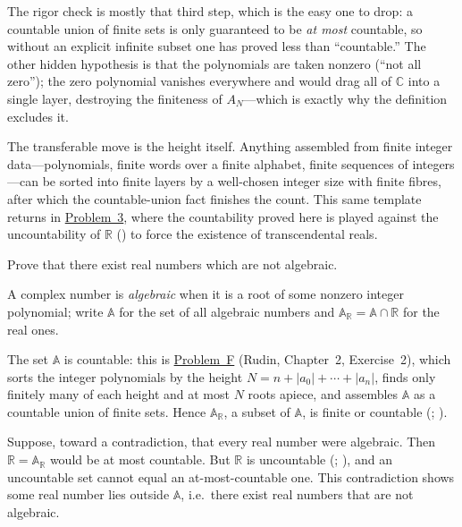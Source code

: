 \documentclass[main.tex]{subfiles}
\begin{document}
\begin{Reflection}
The rigor check is mostly that third step, which is the easy one to drop: a countable union of finite
sets is only guaranteed to be \emph{at most} countable, so without an explicit infinite subset one has
proved less than ``countable.'' The other hidden hypothesis is that the polynomials are taken nonzero
(``not all zero''); the zero polynomial vanishes everywhere and would drag all of $\mathbb{C}$ into a
single layer, destroying the finiteness of $A_N$---which is exactly why the definition excludes it.

The transferable move is the height itself. Anything assembled from finite integer data---polynomials,
finite words over a finite alphabet, finite sequences of integers---can be sorted into finite layers by
a well-chosen integer size with finite fibres, after which the countable-union fact finishes the count.
This same template returns in \hyperlink{prob:3}{Problem~3}, where the countability proved here is
played against the uncountability of $\mathbb{R}$ () to force the existence of transcendental reals.
\end{Reflection}

Prove that there exist real numbers which are not algebraic.

\begin{SolutionBlue}
A complex number is \emph{algebraic} when it is a root of some nonzero integer polynomial; write
$\mathbb A$ for the set of all algebraic numbers and $\mathbb A_{\mathbb R}=\mathbb A\cap\mathbb R$ for
the real ones.

The set $\mathbb A$ is countable: this is \hyperlink{prob:F}{Problem~F} (Rudin, Chapter~2,
Exercise~2), which sorts the integer polynomials by the height $N=n+|a_0|+\cdots+|a_n|$, finds only
finitely many of each height and at most $N$ roots apiece, and assembles $\mathbb A$ as a countable
union of finite sets. Hence $\mathbb A_{\mathbb R}$, a subset of $\mathbb A$, is finite or countable
(; ).

Suppose, toward a contradiction, that every real number were algebraic. Then
$\mathbb R=\mathbb A_{\mathbb R}$ would be at most countable. But $\mathbb R$ is uncountable
(; ), and an uncountable set cannot
equal an at-most-countable one. This contradiction shows some real number lies outside $\mathbb A$,
i.e.\ there exist real numbers that are not algebraic.
\end{SolutionBlue}
\end{document}
